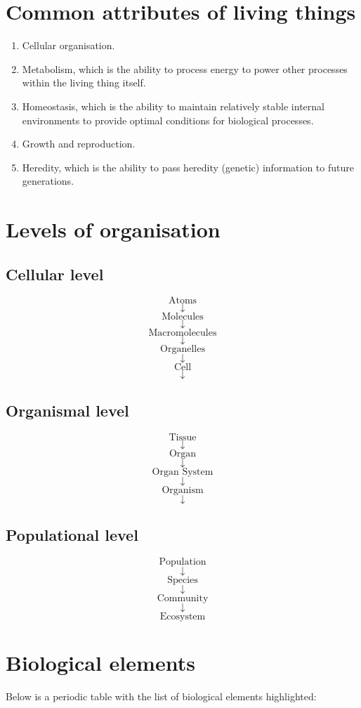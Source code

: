 \documentclass[11pt]{article}
\begin{document}
\newpage
\section{Common attributes of living things}
\label{sec:org4e4eba5}
\begin{enumerate}
\item Cellular organisation.
\item Metabolism, which is the ability to process energy to power other processes within the living thing itself.
\item Homeostasis, which is the ability to maintain relatively stable internal environments to provide optimal conditions for biological processes.
\item Growth and reproduction.
\item Heredity, which is the ability to pass heredity (genetic) information to future generations.
\end{enumerate}

\newpage
\section{Levels of organisation}
\label{sec:org69115ee}

\subsection{Cellular level}
\label{sec:orgfc46fb9}
\[\text{Atoms}\]
\[\downarrow\]
\[\text{Molecules}\]
\[\downarrow\]
\[\text{Macromolecules}\]
\[\downarrow\]
\[\text{Organelles}\]
\[\downarrow\]
\[\text{Cell}\]
\[\downarrow\]
\subsection{Organismal level}
\label{sec:org65f72c3}
\[\text{Tissue}\]
\[\downarrow\]
\[\text{Organ}\]
\[\downarrow\]
\[\text{Organ System}\]
\[\downarrow\]
\[\text{Organism}\]
\[\downarrow\]
\subsection{Populational level}
\label{sec:orgd03f87c}
\[\text{Population}\]
\[\downarrow\]
\[\text{Species}\]
\[\downarrow\]
\[\text{Community}\]
\[\downarrow\]
\[\text{Ecosystem}\]
\section{Biological elements}
\label{sec:org4c0608e}
Below is a periodic table with the list of biological elements highlighted:
\end{document}
